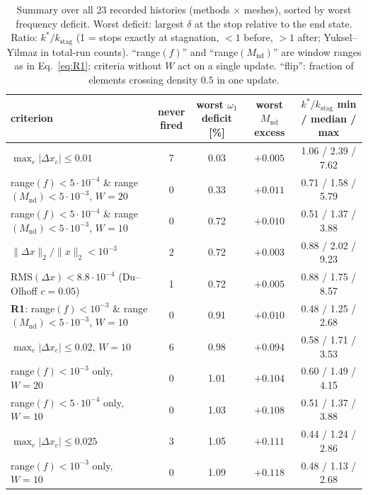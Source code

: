\documentclass[11pt,a4paper]{article}
\newcommand{\Mnd}{M_{\mathrm{nd}}}
\newcommand{\kstag}{k_{\mathrm{stag}}}
\newcommand{\dx}{\Delta x}
\newcommand{\maxdx}{\max_e|\Delta x_e|}
\newcommand{\relL}{\|\Delta x\|_2/\|x\|_2}
\newcommand{\RMS}{\mathrm{RMS}}
\begin{document}
\begin{table}[htbp]
\centering\footnotesize
\caption{Summary over all 23 recorded histories (methods $\times$ meshes), sorted by worst frequency deficit. Worst deficit: largest $\delta$ at the stop relative to the end state. Ratio: $k^*/\kstag$ (1 = stops exactly at stagnation, $<1$ before, $>1$ after; Yuksel--Yilmaz in total-run counts). ``range$(f)$'' and ``range$(\Mnd)$'' are window ranges as in Eq.~\eqref{eq:R1}; criteria without $W$ act on a single update. ``flip'': fraction of elements crossing density $0.5$ in one update.}
\label{tab:D}
\begin{tabular}{@{}lcccc@{}}
\toprule
criterion & \makecell{never\\fired} & \makecell{worst $\omega_1$\\deficit [\%]}
  & \makecell{worst $\Mnd$\\excess} & \makecell{$k^*/\kstag$\\min / median / max} \\
\midrule
$\maxdx \le 0.01$                                       & 7 & 0.03 & $+0.005$ & 1.06 / 2.39 / 7.62 \\
range$(f)<5\cdot10^{-4}$ \& range$(\Mnd)<5\cdot10^{-3}$, $W{=}20$ & 0 & 0.33 & $+0.011$ & 0.71 / 1.58 / 5.79 \\
range$(f)<5\cdot10^{-4}$ \& range$(\Mnd)<5\cdot10^{-3}$, $W{=}10$ & 0 & 0.72 & $+0.010$ & 0.51 / 1.37 / 3.88 \\
$\relL < 10^{-3}$                                       & 2 & 0.72 & $+0.003$ & 0.88 / 2.02 / 9.23 \\
$\RMS(\dx) < 8.8\cdot10^{-4}$ (Du--Olhoff $c{=}0.05$)    & 1 & 0.72 & $+0.005$ & 0.88 / 1.75 / 8.57 \\
\textbf{R1}: range$(f)<10^{-3}$ \& range$(\Mnd)<5\cdot10^{-3}$, $W{=}10$ & 0 & 0.91 & $+0.010$ & 0.48 / 1.25 / 2.68 \\
$\maxdx \le 0.02$, $W{=}10$                              & 6 & 0.98 & $+0.094$ & 0.58 / 1.71 / 3.53 \\
range$(f)<10^{-3}$ only, $W{=}20$                        & 0 & 1.01 & $+0.104$ & 0.60 / 1.49 / 4.15 \\
range$(f)<5\cdot10^{-4}$ only, $W{=}10$                  & 0 & 1.03 & $+0.108$ & 0.51 / 1.37 / 3.88 \\
$\maxdx \le 0.025$                                      & 3 & 1.05 & $+0.111$ & 0.44 / 1.24 / 2.86 \\
range$(f)<10^{-3}$ only, $W{=}10$                        & 0 & 1.09 & $+0.118$ & 0.48 / 1.13 / 2.68 \\

\end{tabular}
\end{table}
\end{document}
